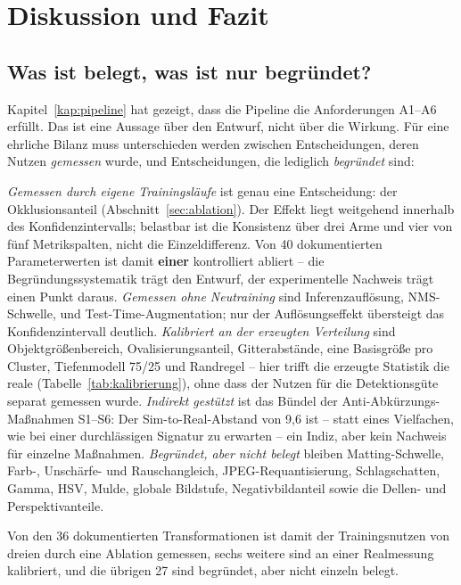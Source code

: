 \chapter{Diskussion und Fazit}
\label{kap:diskussion}

\section{Was ist belegt, was ist nur begründet?}
\label{sec:tragend}

Kapitel~\ref{kap:pipeline} hat gezeigt, dass die Pipeline die Anforderungen
A1--A6 erfüllt. Das ist eine Aussage über den Entwurf, nicht über die Wirkung.
Für eine ehrliche Bilanz muss unterschieden werden zwischen Entscheidungen, deren
Nutzen \emph{gemessen} wurde, und Entscheidungen, die lediglich \emph{begründet}
sind:

\emph{Gemessen durch eigene Trainingsläufe} ist genau eine Entscheidung: der
Okklusionsanteil (Abschnitt~\ref{sec:ablation}). Der Effekt liegt weitgehend
innerhalb des Konfidenzintervalls; belastbar ist die Konsistenz über drei Arme
und vier von fünf Metrikspalten, nicht die Einzeldifferenz. Von 40 dokumentierten
Parameterwerten ist damit \textbf{einer} kontrolliert abliert -- die
Begründungssystematik trägt den Entwurf, der experimentelle Nachweis trägt einen
Punkt daraus. \emph{Gemessen ohne Neutraining} sind Inferenzauflösung,
NMS-Schwelle,  und Test-Time-Augmentation; nur der
Auflösungseffekt übersteigt das Konfidenzintervall deutlich. \emph{Kalibriert an
der erzeugten Verteilung} sind Objektgrößenbereich, Ovalisierungsanteil,
Gitterabstände, eine Basisgröße pro Cluster, Tiefenmodell 75/25 und Randregel --
hier trifft die erzeugte Statistik die reale (Tabelle~\ref{tab:kalibrierung}),
ohne dass der Nutzen für die Detektionsgüte separat gemessen wurde.
\emph{Indirekt gestützt} ist das Bündel der Anti-Abkürzungs-Maßnahmen S1--S6: Der
Sim-to-Real-Abstand von 9,6\PP{} ist -- statt eines Vielfachen, wie bei einer
durchlässigen Signatur zu erwarten -- ein Indiz, aber kein Nachweis für einzelne
Maßnahmen. \emph{Begründet, aber nicht belegt} bleiben Matting-Schwelle, Farb-,
Unschärfe- und Rauschangleich, JPEG-Requantisierung, Schlagschatten, Gamma, HSV,
Mulde, globale Bildstufe, Negativbildanteil sowie die Dellen- und
Perspektivanteile.

Von den 36 dokumentierten Transformationen ist damit der Trainingsnutzen von
dreien durch eine Ablation gemessen, sechs weitere sind an einer Realmessung
kalibriert, und die übrigen 27 sind begründet, aber nicht einzeln belegt.

